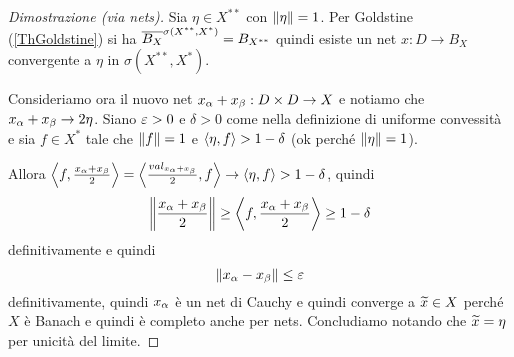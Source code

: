 \begin{proof}[Dimostrazione (via nets)]
Sia $\eta\in X^{\ast\ast}$ con $\left\Vert{\eta}\right\Vert=1$. Per Goldstine (\ref{ThGoldstine}) si ha $\overline{B_X}^{\sigma(X^{\ast\ast},X^\ast)}=B_{X^{\ast\ast}}$ quindi esiste un net $x:D\to B_X$ convergente a $\eta$ in $\sigma(X^{\ast\ast},X^\ast)$.

Consideriamo ora il nuovo net $x_\alpha+x_\beta:D\times D\to X$ e notiamo che $x_\alpha+x_\beta\to 2\eta$. Siano $\varepsilon>0$ e $\delta>0$ come nella definizione di uniforme convessit\`a e sia $f\in X^\ast$ tale che $\left\Vert{f}\right\Vert=1$ e $\left\langle {\eta,f}\right\rangle> 1-\delta$ (ok perch\'e $\left\Vert{\eta}\right\Vert=1$).

Allora $\left\langle {f,\frac{x_\alpha+x_\beta}2}\right\rangle=\left\langle {\frac{val_{x_\alpha+x_\beta}}2,f}\right\rangle\to \left\langle {\eta, f}\right\rangle>1-\delta$, quindi
\[\left\Vert{\frac{x_\alpha+x_\beta}2}\right\Vert\geq \left\langle {f,\frac{x_\alpha+x_\beta}2}\right\rangle\geq 1-\delta\]
definitivamente e quindi
\[\left\Vert{x_\alpha-x_\beta}\right\Vert\leq \varepsilon\]
definitivamente, quindi $x_\alpha$ \`e un net di Cauchy e quindi converge a $\widetilde{x}\in X$ perch\'e $X$ \`e Banach e quindi \`e completo anche per nets. Concludiamo notando che $\widetilde{x}=\eta$ per unicit\`a del limite. 
\end{proof}


